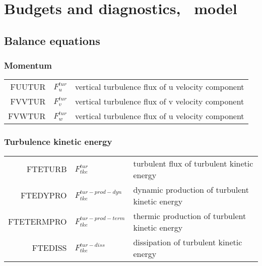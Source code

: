 \chapter{Budgets and diagnostics, \arome\ model}

\section{Balance equations}

\subsection{Momentum}

  \begin{tabular}{r l l}

       FUUTUR       &$F_{u}^{tur}$      &vertical turbulence flux of u velocity component\\
       FVVTUR       &$F_{v}^{tur}$  &vertical turbulence flux of v velocity component\\
       FVWTUR       &$F_{w}^{tur}$      &vertical turbulence flux of u velocity component\\

  \end{tabular}

  \subsection{Turbulence kinetic energy}
  \begin{tabular}{rll}

       FTETURB      &$F_{tke}^{tur}$   &turbulent flux of turbulent kinetic energy\\
       FTEDYPRO     &$F_{tke}^{tur-prod-dyn}$ &dynamic production of turbulent kinetic energy\\
       FTETERMPRO   &$F_{tke}^{tur-prod-term}$ &thermic production of turbulent kinetic energy \\
       FTEDISS      &$F_{tke}^{tur-diss}$ &dissipation of turbulent kinetic energy\\
  \end{tabular}

